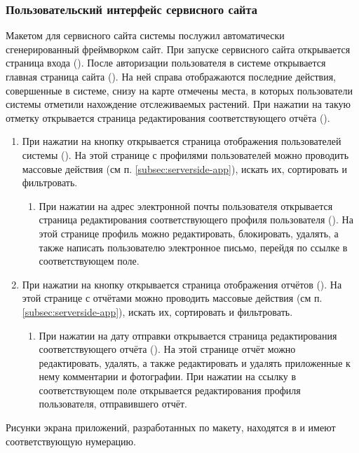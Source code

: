 \subsubsection{Пользовательский интерфейс сервисного сайта}

Макетом для сервисного сайта системы послужил автоматически сгенерированный фреймворком  сайт.
При запуске сервисного сайта открывается страница входа ().
После авторизации пользователя в системе открывается главная страница сайта ().
На ней справа отображаются последние действия, совершенные в системе, снизу на карте отмечены места, в которых пользователи системы отметили нахождение отслеживаемых растений.
При нажатии на такую отметку открывается страница редактирования соответствующего отчёта ().
\begin{enumerate}
	\item При нажатии на кнопку  открывается страница отображения пользователей системы ().
	На этой странице с профилями пользователей можно проводить массовые действия (см п. \ref{subsec:serverside-app}), искать их, сортировать и фильтровать.
	\begin{enumerate}
		\item При нажатии на адрес электронной почты пользователя открывается страница редактирования соответствующего профиля пользователя ().
		На этой странице профиль можно редактировать, блокировать, удалять, а также написать пользователю электронное письмо, перейдя по ссылке в соответствующем поле.
	\end{enumerate}
	\item При нажатии на кнопку  открывается страница отображения отчётов ().
	На этой странице с отчётами можно проводить массовые действия (см п. \ref{subsec:serverside-app}), искать их, сортировать и фильтровать.
	\begin{enumerate}
		\item При нажатии на дату отправки открывается страница редактирования соответствующего отчёта ().
		На этой странице отчёт можно редактировать, удалять, а также редактировать и удалять приложенные к нему комментарии и фотографии.
		При нажатии на ссылку в соответствующем поле открывается редактирования профиля пользователя, отправившего отчёт.
	\end{enumerate}
\end{enumerate}

\tab
Рисунки экрана приложений, разработанных по макету, находятся в  и имеют соответствующую нумерацию.
